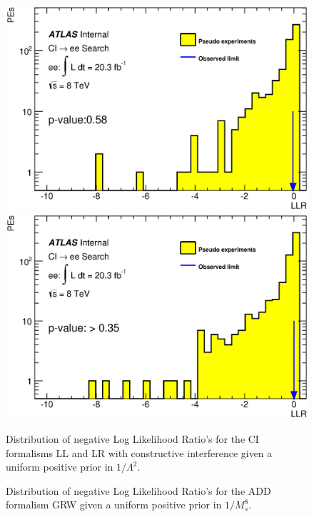     \begin{figure}[h]
        \begin{center}
            \includegraphics[scale=0.4]{images/ee__LL_minus_L2/LLR.eps}
            \includegraphics[scale=0.4]{images/ee__LR_minus_L2/LLR.eps}
        \end{center}
       \caption{Distribution of negative Log Likelihood Ratio's for the CI formalisms LL and LR with constructive interference given a uniform positive prior in $1/\Lambda^{2}$.}
       \label{fig:LLR_CI_main}
    \end{figure}

    \begin{figure}[h]
        \begin{center}
        \end{center}
       \caption{Distribution of negative Log Likelihood Ratio's for the ADD formalism GRW given a uniform positive prior in $1/M_{s}^{8}$.}
       \label{fig:LLR_ADD_main}
    \end{figure}


